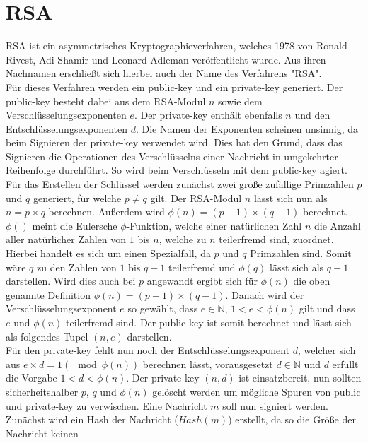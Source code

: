 \documentclass[thesis=bachelor,faculty=cb]{hsmw-thesis}
\begin{document}
\section{RSA}
RSA ist ein asymmetrisches Kryptographieverfahren, welches 1978 von Ronald Rivest, Adi Shamir und Leonard Adleman veröffentlicht wurde. Aus ihren Nachnamen erschließt sich hierbei auch der Name des Verfahrens "RSA".
\\[1cm]
Für dieses Verfahren werden ein public-key und ein private-key generiert. Der public-key besteht dabei aus dem RSA-Modul $n$ sowie dem Verschlüsselungsexponenten $e$. Der private-key enthält ebenfalls $n$ und den Entschlüsselungsexponenten $d$.
Die Namen der Exponenten scheinen unsinnig, da beim Signieren der private-key verwendet wird. Dies hat den Grund, dass das Signieren die Operationen des Verschlüsselns einer Nachricht in umgekehrter Reihenfolge durchführt. So wird 
beim Verschlüsseln mit dem public-key agiert.
\\[1cm]
Für das Erstellen der Schlüssel werden zunächst zwei große zufällige Primzahlen $p$ und $q$ generiert, für welche $p \neq q$ gilt. Der RSA-Modul $n$ lässt sich nun als $n = p \times q$ berechnen. Außerdem wird \begin{math}\phi(n) = (p-1)\times(q-1) \end{math} berechnet.
$\phi()$ meint die Eulersche $\phi$-Funktion, welche einer natürlichen Zahl $n$ die Anzahl aller natürlicher Zahlen von $1$ bis $n$, welche zu $n$ teilerfremd sind, zuordnet. Hierbei handelt es sich um einen Spezialfall, da $p$ und $q$ Primzahlen sind. Somit wäre $q$ zu den Zahlen von $1$ bis $q-1$ teilerfremd und $\phi(q)$
lässt sich als $q-1$ darstellen. Wird dies auch bei $p$ angewandt ergibt sich für $\phi(n)$ die oben genannte Definition $\phi(n) = (p-1) \times (q-1)$. Danach wird der Verschlüsselungsexponent $e$ so gewählt, dass $e \in \mathbb{N}$, $1 < e < \phi(n)$ gilt und dass $e$ und $\phi(n)$ teilerfremd
sind. Der public-key ist somit berechnet und lässt sich als folgendes Tupel $(n, e)$ darstellen. 
\\[1cm]
Für den private-key fehlt nun noch der Entschlüsselungsexponent $d$, welcher sich aus $e \times d = 1 ( \mod \phi(n))$ berechnen lässt, vorausgesetzt $d \in \mathbb{N}$ und $d$ erfüllt die Vorgabe $1 < d < \phi(n)$.
Der private-key $(n, d)$ ist einsatzbereit, nun sollten sicherheitshalber $p$, $q$ und $\phi(n)$ gelöscht werden um mögliche Spuren von public und private-key zu verwischen. Eine Nachricht $m$ soll nun signiert werden. Zunächst wird ein Hash der Nachricht ($Hash(m)$) erstellt, da so die Größe der Nachricht keinen
\end{document}

